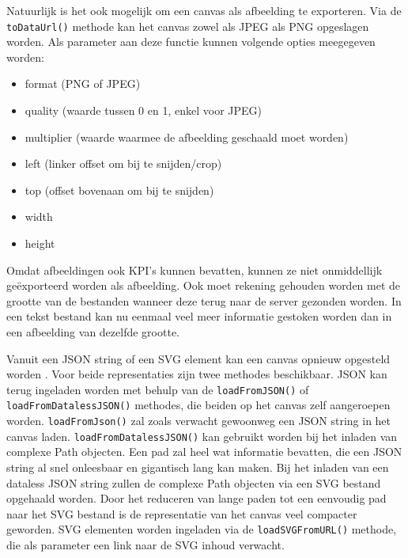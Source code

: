 Natuurlijk is het ook mogelijk om een canvas als afbeelding te exporteren. Via de \lstinline{toDataUrl()} methode kan het canvas zowel als JPEG als PNG opgeslagen worden. Als parameter aan deze functie kunnen volgende opties meegegeven worden:

\begin{itemize}
	\item format (PNG of JPEG)
	\item quality (waarde tussen 0 en 1, enkel voor JPEG)
	\item multiplier (waarde waarmee de afbeelding geschaald moet worden)
	\item left (linker offset om bij te snijden/crop)
	\item top (offset bovenaan om bij te snijden)
	\item width 
	\item height
\end{itemize}

Omdat afbeeldingen ook KPI's kunnen bevatten, kunnen ze niet onmiddellijk ge\"{e}xporteerd worden als afbeelding. Ook moet rekening gehouden worden met de grootte van de bestanden wanneer deze terug naar de server gezonden worden. In een tekst bestand kan nu eenmaal veel meer informatie gestoken worden dan in een afbeelding van dezelfde grootte. 

Vanuit een JSON string of een SVG element kan een canvas opnieuw opgesteld worden \cite{SVGElement}. Voor beide representaties zijn twee methodes beschikbaar. JSON kan terug ingeladen worden met behulp van de \lstinline{loadFromJSON()} of \lstinline{loadFromDatalessJSON()} methodes, die beiden op het canvas zelf aangeroepen worden. \lstinline{loadFromJson()} zal zoals verwacht gewoonweg een JSON string in het canvas laden. \lstinline{loadFromDatalessJSON()} kan gebruikt worden bij het inladen van complexe Path objecten. Een pad zal heel wat informatie bevatten, die een JSON string al snel onleesbaar en gigantisch lang kan maken. Bij het inladen van een dataless JSON string zullen de complexe Path objecten via een SVG bestand opgehaald worden. Door het reduceren van lange paden tot een eenvoudig pad naar het SVG bestand is de representatie van het canvas veel compacter geworden. SVG elementen worden ingeladen via de \lstinline{loadSVGFromURL()} methode, die als parameter een link naar de SVG inhoud verwacht. 


